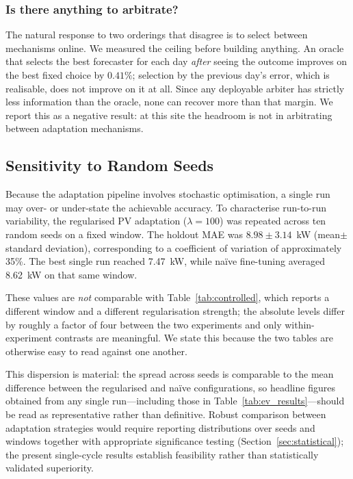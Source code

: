 \documentclass[journal]{IEEEtran}
\begin{document}
\subsubsection{Is there anything to arbitrate?}
The natural response to two orderings that disagree is to select between
mechanisms online. We measured the ceiling before building anything. An
oracle that selects the best forecaster for each day \emph{after} seeing
the outcome improves on the best fixed choice by $0.41\%$; selection by the
previous day's error, which is realisable, does not improve on it at all.
Since any deployable arbiter has strictly less information than the
oracle, none can recover more than that margin. We report this as a
negative result: at this site the headroom is not in arbitrating between
adaptation mechanisms.

\subsection{Sensitivity to Random Seeds}
\label{sec:results_seeds}

Because the adaptation pipeline involves stochastic optimisation, a
single run may over- or under-state the achievable accuracy. To
characterise run-to-run variability, the regularised PV adaptation
($\lambda=100$) was repeated across ten random seeds on a fixed window.
The holdout MAE was $8.98\pm3.14$~kW (mean$\pm$standard deviation),
corresponding to a coefficient of variation of approximately 35\%. The
best single run reached 7.47~kW, while na\"ive fine-tuning averaged
8.62~kW on that same window.

These values are \emph{not} comparable with
Table~\ref{tab:controlled}, which reports a different window and a
different regularisation strength; the absolute levels differ by roughly
a factor of four between the two experiments and only within-experiment
contrasts are meaningful. We state this because the two tables are
otherwise easy to read against one another.

This dispersion is material: the spread across seeds is comparable to the
mean difference between the regularised and na\"ive configurations, so
headline figures obtained from any single run---including those in
Table~\ref{tab:ev_results}---should be read as representative rather than
definitive. Robust comparison between adaptation strategies would require
reporting distributions over seeds and windows together with appropriate
significance testing (Section~\ref{sec:statistical}); the present
single-cycle results establish feasibility rather than statistically
validated superiority.
\end{document}
